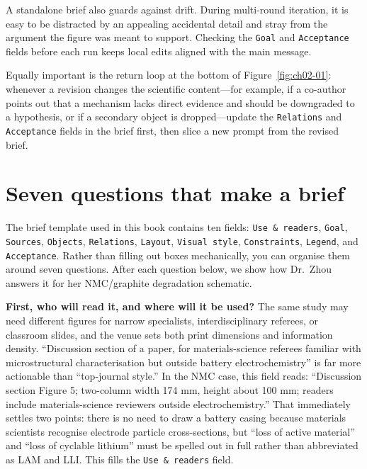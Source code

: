 A standalone brief also guards against drift. During multi-round iteration, it is easy to be distracted by an appealing accidental detail and stray from the argument the figure was meant to support. Checking the \texttt{Goal} and \texttt{Acceptance} fields before each run keeps local edits aligned with the main message.

Equally important is the return loop at the bottom of Figure~\ref{fig:ch02-01}: whenever a revision changes the scientific content---for example, if a co-author points out that a mechanism lacks direct evidence and should be downgraded to a hypothesis, or if a secondary object is dropped---update the \texttt{Relations} and \texttt{Acceptance} fields in the brief first, then slice a new prompt from the revised brief.

\section{Seven questions that make a brief}

The brief template used in this book contains ten fields: \texttt{Use \& readers}, \texttt{Goal}, \texttt{Sources}, \texttt{Objects}, \texttt{Relations}, \texttt{Layout}, \texttt{Visual style}, \texttt{Constraints}, \texttt{Legend}, and \texttt{Acceptance}. Rather than filling out boxes mechanically, you can organise them around seven questions. After each question below, we show how Dr.\ Zhou answers it for her NMC/graphite degradation schematic.

\textbf{First, who will read it, and where will it be used?} The same study may need different figures for narrow specialists, interdisciplinary referees, or classroom slides, and the venue sets both print dimensions and information density. ``Discussion section of a paper, for materials-science referees familiar with microstructural characterisation but outside battery electrochemistry'' is far more actionable than ``top-journal style.'' In the NMC case, this field reads: ``Discussion section Figure 5; two-column width 174 mm, height about 100 mm; readers include materials-science reviewers outside electrochemistry.'' That immediately settles two points: there is no need to draw a battery casing because materials scientists recognise electrode particle cross-sections, but ``loss of active material'' and ``loss of cyclable lithium'' must be spelled out in full rather than abbreviated as LAM and LLI. This fills the \texttt{Use \& readers} field.

